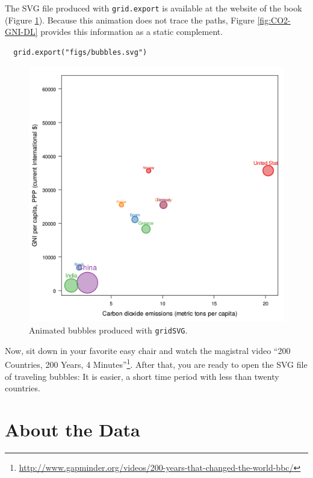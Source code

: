 \documentclass[smallroyalvopaper]{memoir}
\begin{document}
The SVG file produced with \texttt{grid.export} is available at the website
of the book (Figure \ref{fig:bubblesSVG}). Because this animation does
not trace the paths, Figure \ref{fig:CO2-GNI-DL} provides this
information as a static complement.


\lstset{language=r,label= ,caption= ,captionpos=b,numbers=none}
\begin{lstlisting}
  grid.export("figs/bubbles.svg")
\end{lstlisting}

\begin{figure}
  \centering
  \includegraphics[width=\textwidth]{figs/bubbles.png}
  \caption{Animated bubbles produced with \texttt{gridSVG}.}
  \label{fig:bubblesSVG}
\end{figure}

Now, sit down in your favorite easy chair and watch the magistral
video ``200 Countries, 200 Years, 4 Minutes''\footnote{\url{http://www.gapminder.org/videos/200-years-that-changed-the-world-bbc/}}. After that, you are
ready to open the SVG file of traveling bubbles: It is easier, a short
time period with less than twenty countries.

\chapter{About the Data}
\label{sec:org0ef698f}
\label{cha:dataTime}
\end{document}
